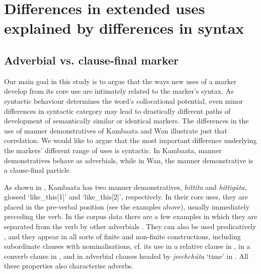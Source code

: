 \documentclass[output=paper,colorlinks,citecolor=brown]{langscibook}
\begin{document}
\section{Differences in extended uses explained by differences in syntax}\label{sec:nikitina:3}

\subsection{Adverbial vs. clause-final marker}\label{sec:nikitina:3.1}


Our main goal in this study is to argue that the ways new uses of a marker develop from its core use are intimately related to the marker’s syntax. As syntactic behaviour determines the word’s collocational potential, even minor differences in syntactic category may lead to drastically different paths of development of semantically similar or identical markers. The differences in the use of manner demonstratives of Kambaata and Wan illustrate just that correlation. We would like to argue that the most important difference underlying the markers’ different range of uses is syntactic. In Kambaata, manner demonstratives behave as adverbials, while in Wan, the manner demonstrative is a clause-final particle.

As shown in , Kambaata has two manner demonstratives, \textit{hittíta} and \textit{hittigúta}, glossed ‘like\_this[1]’ and ‘like\_this[2]’, respectively. In their core uses, they are placed in the pre-verbal position (see the examples above), usually immediately preceding the verb. In the corpus data there are a few examples in which they are separated from the verb by other adverbials . They can also be used predicatively , and they appear in all sorts of finite and non-finite constructions, including subordinate clauses with nominalisations, cf. its use in a relative clause in , in a converb clause in , and in adverbial clauses headed by \textit{jeechchúta} ‘time’ in . All these properties also characterise adverbs.
\end{document}
